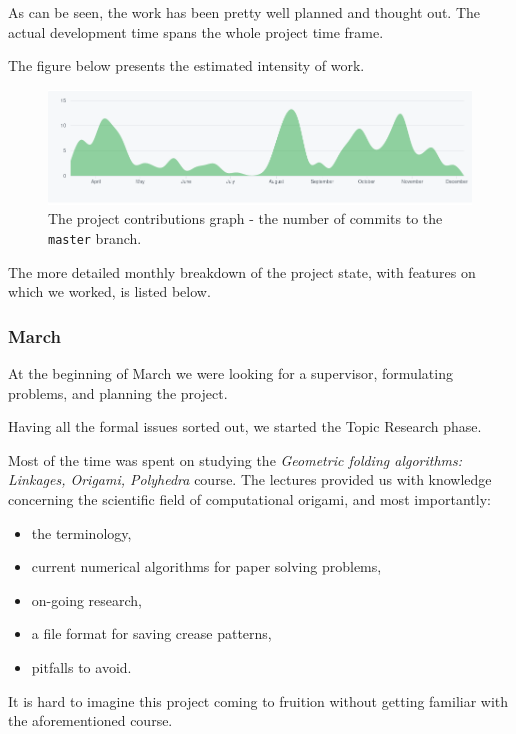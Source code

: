 As can be seen, the work has been pretty well planned and thought out. The actual development time spans the whole project time frame.

The figure below presents the estimated intensity of work.

\begin{figure}[H]
	\label{04-commit-intensity}
	\caption{The project contributions graph - the number of commits to the \texttt{master} branch.}
  \centering
    \includegraphics[width=1.01\textwidth]{assets/4-contributions-graph.png}
\end{figure}

The more detailed monthly breakdown of the project state, with features on which we worked, is listed below.

\subsubsection{March}

At the beginning of March we were looking for a supervisor, formulating problems, and planning the project.

\medskip

Having all the formal issues sorted out, we started the Topic Research phase.

Most of the time was spent on studying the \textit{Geometric folding algorithms: Linkages, Origami, Polyhedra} course\cite{mit-course}.
The lectures provided us with knowledge concerning the scientific field of computational origami, and most importantly:
\begin{itemize}
	\item the terminology,
	\item current numerical algorithms for paper solving problems,
	\item on-going research,
	\item a file format for saving crease patterns,
	\item pitfalls to avoid.
\end{itemize}

It is hard to imagine this project coming to fruition without getting familiar with the aforementioned course.

